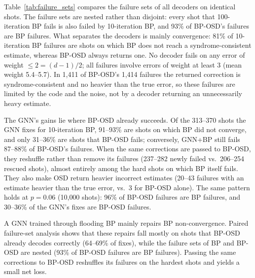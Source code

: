 Table~\ref{tab:failure_sets} compares the failure sets of all decoders on
identical shots. The failure sets are nested rather than disjoint: every
shot that 100-iteration BP fails is also failed by 10-iteration BP, and
93\% of BP-OSD's failures are BP failures. What separates the decoders is
mainly convergence: 81\% of 10-iteration BP failures are shots on which BP
does not reach a syndrome-consistent estimate, whereas BP-OSD always
returns one. No decoder fails on any error of weight $\le 2=(d-1)/2$;
all failures involve errors of weight at least 3 (mean weight 5.4--5.7).
In 1{,}411 of BP-OSD's 1{,}414 failures the returned correction is
syndrome-consistent and no heavier than the true error, so these failures
are limited by the code and the noise, not by a decoder returning an
unnecessarily heavy estimate.

The GNN's gains lie where BP-OSD already succeeds. Of the 313--370 shots
the GNN fixes for 10-iteration BP, 91--93\% are shots on which BP did not
converge, and only 31--36\% are shots that BP-OSD fails; conversely,
GNN+BP still fails 87--88\% of BP-OSD's failures. When the same
corrections are passed to BP-OSD, they reshuffle rather than remove its
failures (237--282 newly failed vs.\ 206--254 rescued shots), almost
entirely among the hard shots on which BP itself fails. They also make
OSD return heavier incorrect estimates (20--43 failures with an estimate
heavier than the true error, vs.\ 3 for BP-OSD alone). The same pattern
holds at $p=0.06$ (10{,}000 shots): 96\% of BP-OSD failures are BP
failures, and 30--36\% of the GNN's fixes are BP-OSD failures.

A GNN trained through flooding BP mainly repairs BP non-convergence.
Paired failure-set analysis shows that these repairs fall mostly on shots
that BP-OSD already decodes correctly (64--69\% of fixes), while the
failure sets of BP and BP-OSD are nested (93\% of BP-OSD failures are BP
failures). Passing the same corrections to BP-OSD reshuffles its failures
on the hardest shots and yields a small net loss.
